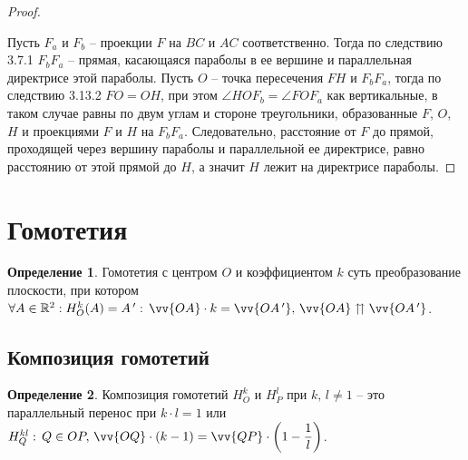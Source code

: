 \documentclass[12pt]{article}
\theoremstyle{definition}
\newtheorem{definition}{Определение}
\newcommand{\R}{\mathbb{R}}
\begin{document}
\begin{proof}
\begin{center}
        \end{center}
        Пусть $F_a$ и $F_b$ -- проекции $F$ на $BC$ и $AC$ соответственно. Тогда по следствию 3.7.1 $F_bF_a$ -- прямая, касающаяся параболы в ее вершине и параллельная директрисе этой параболы. Пусть $O$ -- точка пересечения $FH$ и $F_bF_a$, тогда по следствию 3.13.2 $FO=OH$, при этом $\angle HOF_b=\angle FOF_a$ как вертикальные, в таком случае равны по двум углам и стороне треугольники, образованные $F$, $O$, $H$ и проекциями $F$ и $H$ на $F_bF_a$. Следовательно, расстояние от $F$ до прямой, проходящей через вершину параболы и параллельной ее директрисе, равно расстоянию от этой прямой до $H$, а значит $H$ лежит на директрисе параболы.
    \end{proof}

    \section{Гомотетия}

    \begin{definition}
        Гомотетия с центром $O$ и коэффициентом $k$ суть преобразование плоскости, при котором $\forall A \in \R^2: H_O^k(A)=A\,':\,\vv{OA}\cdot k = \vv{OA\,'},\,\vv{OA} \upuparrows \vv{OA\,'}$.
    \end{definition}

    \setcounter{subsection}{0}
    \subsection{Композиция гомотетий}
    \begin{definition}
        Композиция гомотетий $H_O^k$ и $H_P^l$ при $k,\,l\neq 1$ -- это параллельный перенос при $k\cdot l=1$ или $H_Q^{kl}:\,Q \in OP,\, \vv{OQ}\cdot (k-1)=\vv{QP}\cdot \left(1-\dfrac{1}{l}\right)$.
    \end{definition}
\end{document}
